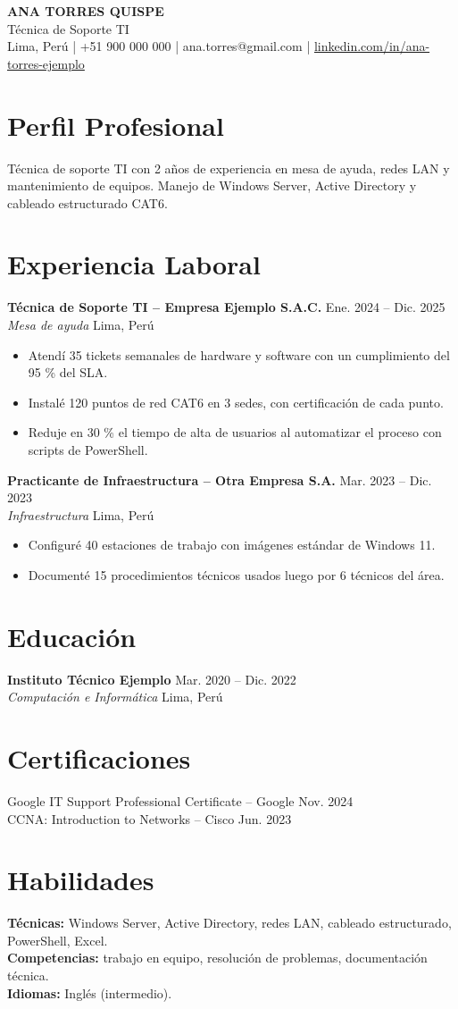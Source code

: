 \documentclass[10pt]{article}
\newcommand{\entry}[4]{\textbf{#1} \hfill #2\\ \textit{#3} \hfill #4\par}
\begin{document}
\begin{center}
{\Large\bfseries ANA TORRES QUISPE}\\[2pt]
Técnica de Soporte TI\\[2pt]
Lima, Perú \;|\; +51 900 000 000 \;|\; ana.torres@gmail.com \;|\; \href{https://linkedin.com/in/ana-torres-ejemplo}{linkedin.com/in/ana-torres-ejemplo}
\end{center}
\section{Perfil Profesional}
Técnica de soporte TI con 2 años de experiencia en mesa de ayuda, redes LAN y mantenimiento de equipos. Manejo de Windows Server, Active Directory y cableado estructurado CAT6.
\section{Experiencia Laboral}
\entry{Técnica de Soporte TI -- Empresa Ejemplo S.A.C.}{Ene. 2024 -- Dic. 2025}{Mesa de ayuda}{Lima, Perú}
\begin{itemize}
  \item Atendí 35 tickets semanales de hardware y software con un cumplimiento del 95 \% del SLA.
  \item Instalé 120 puntos de red CAT6 en 3 sedes, con certificación de cada punto.
  \item Reduje en 30 \% el tiempo de alta de usuarios al automatizar el proceso con scripts de PowerShell.
\end{itemize}
\entry{Practicante de Infraestructura -- Otra Empresa S.A.}{Mar. 2023 -- Dic. 2023}{Infraestructura}{Lima, Perú}
\begin{itemize}
  \item Configuré 40 estaciones de trabajo con imágenes estándar de Windows 11.
  \item Documenté 15 procedimientos técnicos usados luego por 6 técnicos del área.
\end{itemize}
\section{Educación}
\entry{Instituto Técnico Ejemplo}{Mar. 2020 -- Dic. 2022}{Computación e Informática}{Lima, Perú}
\section{Certificaciones}
Google IT Support Professional Certificate -- Google \hfill Nov. 2024\\
CCNA: Introduction to Networks -- Cisco \hfill Jun. 2023
\section{Habilidades}
\textbf{Técnicas:} Windows Server, Active Directory, redes LAN, cableado estructurado, PowerShell, Excel.\\
\textbf{Competencias:} trabajo en equipo, resolución de problemas, documentación técnica.\\
\textbf{Idiomas:} Inglés (intermedio).
\end{document}
